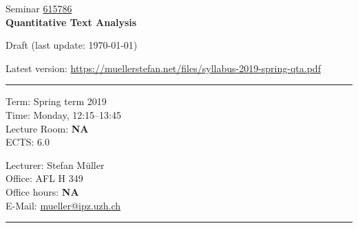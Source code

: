 \documentclass[abstract=on,parskip=full,headings=standardclasses,fontsize=11pt,paper=a4]{scrartcl}
\begin{document}
	
\singlespacing

\noindent
{}%
\hfill%

\singlespacing
\vspace{1cm}

\begin{center}
{\large Seminar \href{https://studentservices.uzh.ch/uzh/anonym/vvz/index.html#/details/2018/004/SM/50926554}{615786}} \\ 
\medskip
{\Large \textbf{Quantitative Text Analysis}} 
\bigskip


{\large  {Draft (last update: \today)}}\\
\bigskip

Latest version: \url{https://muellerstefan.net/files/syllabus-2019-spring-qta.pdf}
\end{center}

\vspace{1.5cm}

\hrule
\medskip
\begin{minipage}[t]{0.5\textwidth}
Term: Spring term 2019 \\
Time: Monday, 12:15--13:45 \\
Lecture Room: \textbf{NA} \\
ECTS: 6.0
\end{minipage}
\begin{minipage}[t]{0.5\textwidth}
\begin{flushright}
Lecturer: Stefan Müller \\
Office:  AFL H 349\\
Office hours: \textbf{NA} \\
E-Mail: \textsf{\href{mailto:mueller@ipz.uzh.ch}{mueller@ipz.uzh.ch}}
\end{flushright}
\end{minipage}
\medskip
\vspace{2.5mm}
\hrule 
\end{document}
